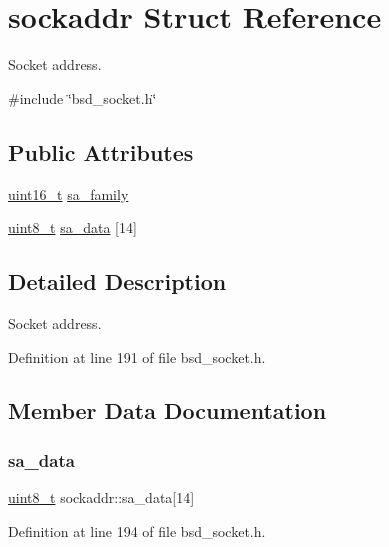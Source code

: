 \hypertarget{structsockaddr}{}\section{sockaddr Struct Reference}
\label{structsockaddr}


Socket address.  




{\ttfamily \#include \char`\"{}bsd\+\_\+socket.\+h\char`\"{}}

\subsection*{Public Attributes}
\begin{DoxyCompactItemize}
\item 
\hyperlink{stdint_8h_a273cf69d639a59973b6019625df33e30}{uint16\+\_\+t} \hyperlink{structsockaddr_a24dbd3e20c62f767f18ddaec18ed3b63}{sa\+\_\+family}
\item 
\hyperlink{stdint_8h_aba7bc1797add20fe3efdf37ced1182c5}{uint8\+\_\+t} \hyperlink{structsockaddr_a7fc879ec123f4fb967b888440f215315}{sa\+\_\+data} \mbox{[}14\mbox{]}
\end{DoxyCompactItemize}


\subsection{Detailed Description}
Socket address. 

Definition at line 191 of file bsd\+\_\+socket.\+h.



\subsection{Member Data Documentation}
\mbox{\label{structsockaddr_a7fc879ec123f4fb967b888440f215315}} 
\subsubsection{\texorpdfstring{sa\+\_\+data}{sa\_data}}
{\footnotesize\ttfamily \hyperlink{stdint_8h_aba7bc1797add20fe3efdf37ced1182c5}{uint8\+\_\+t} sockaddr\+::sa\+\_\+data\mbox{[}14\mbox{]}}



Definition at line 194 of file bsd\+\_\+socket.\+h.

